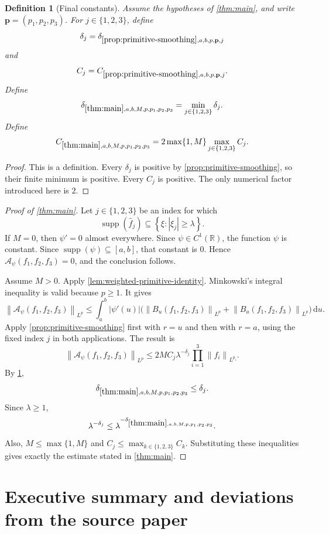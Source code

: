 \documentclass[11pt]{article}
\newtheorem{definition}[theorem]{Definition}
\newcommand{\R}{\mathbb{R}}
\newcommand{\supp}{\operatorname{supp}}
\newcommand{\A}{\mathcal{A}}
\newcommand{\dd}{\,\mathrm{d}}
\newcommand{\norm}[2]{\left\lVert #1\right\rVert_{#2}}
\newcommand{\Cst}[2]{C_{\ref{#1},#2}}
\newcommand{\Exp}[2]{\delta_{\ref{#1},#2}}
\newcommand{\abs}[1]{\left|#1\right|}
\newcommand{\set}[1]{\left\{#1\right\}}
\newcommand{\indices}{\{1,2,3\}}
\begin{document}
\begin{definition}[Final constants]\label{def:main-constants}
Assume the hypotheses of \cref{thm:main}, and write \(\mathbf p=(p_1,p_2,p_3)\).  For \(j\in\indices\), define
\[
\delta_j=\Exp{prop:primitive-smoothing}{a,b,p,\mathbf p,j}
\]
and
\[
C_j=\Cst{prop:primitive-smoothing}{a,b,p,\mathbf p,j}.
\]
Define
\[
\Exp{thm:main}{a,b,M,p,p_1,p_2,p_3}
=
\min_{j\in\indices}\delta_j.
\]
Define
\[
\Cst{thm:main}{a,b,M,p,p_1,p_2,p_3}
=
2\max\{1,M\}\max_{j\in\indices}C_j.
\]
\end{definition}

\begin{proof}
This is a definition.  Every \(\delta_j\) is positive by \cref{prop:primitive-smoothing}, so their finite minimum is positive.  Every \(C_j\) is positive.  The only numerical factor introduced here is \(2\).
\end{proof}

\begin{proof}[Proof of \cref{thm:main}]
Let \(j\in\indices\) be an index for which
\[
\supp(\widehat f_j)\subseteq\set{\xi:\abs{\xi_j}\geq\lambda}.
\]
If \(M=0\), then \(\psi'=0\) almost everywhere.  Since \(\psi\in C^1(\R)\), the function \(\psi\) is constant.  Since \(\supp(\psi)\subseteq[a,b]\), that constant is \(0\).  Hence \(\A_\psi(f_1,f_2,f_3)=0\), and the conclusion follows.

Assume \(M>0\).  Apply \cref{lem:weighted-primitive-identity}.  Minkowski's integral inequality is valid because \(p\geq1\).  It gives
\[
\norm{\A_\psi(f_1,f_2,f_3)}{L^p}
\leq
\int_a^b\abs{\psi'(u)}
\bigl(
\norm{B_u(f_1,f_2,f_3)}{L^p}
+
\norm{B_a(f_1,f_2,f_3)}{L^p}
\bigr)\dd u.
\]
Apply \cref{prop:primitive-smoothing} first with \(r=u\) and then with \(r=a\), using the fixed index \(j\) in both applications.  The result is
\[
\norm{\A_\psi(f_1,f_2,f_3)}{L^p}
\leq
2MC_j\lambda^{-\delta_j}
\prod_{i=1}^{3}\norm{f_i}{L^{p_i}}.
\]
By \cref{def:main-constants},
\[
\Exp{thm:main}{a,b,M,p,p_1,p_2,p_3}\leq\delta_j.
\]
Since \(\lambda\geq1\),
\[
\lambda^{-\delta_j}
\leq
\lambda^{-\Exp{thm:main}{a,b,M,p,p_1,p_2,p_3}}.
\]
Also, \(M\leq\max\{1,M\}\) and \(C_j\leq\max_{k\in\indices}C_k\).  Substituting these inequalities gives exactly the estimate stated in \cref{thm:main}.
\end{proof}

\section{Executive summary and deviations from the source paper}
\end{document}
